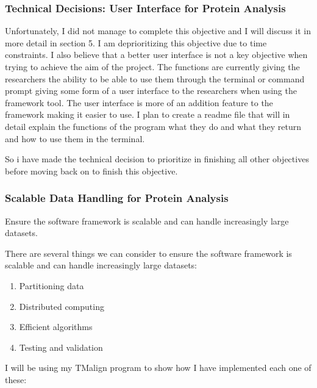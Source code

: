 \documentclass[]{final_report}
\begin{document}
\subsubsection{Technical Decisions: User Interface for Protein Analysis}
Unfortunately, I did not manage to complete this objective and I will discuss it in more detail in section 5. I am deprioritizing this objective due to time constraints. I also believe that a better user interface is not a key objective when trying to achieve the aim of the project. The functions are currently giving the researchers the ability to be able to use them through the terminal or command prompt giving some form of a user interface to the researchers when using the framework tool. The user interface is more of an addition feature to the framework making it easier to use. I plan to create a readme file that will in detail explain the functions of the program what they do and what they return and how to use them in the terminal.

So i have made the technical decision to prioritize in finishing all other objectives before moving back on to finish this objective.

\clearpage

\subsubsection{Scalable Data Handling for Protein Analysis}
\begin{displayquote}
    Ensure the software framework is scalable and can handle increasingly large datasets.
\end{displayquote}

There are several things we can consider to ensure the software framework is scalable and can handle increasingly large datasets:

\begin{enumerate}
    \item Partitioning data
    \item Distributed computing
    \item Efficient algorithms
    \item Testing and validation
\end{enumerate}

I will be using my TMalign program to show how I have implemented each one of these:
\end{document}
